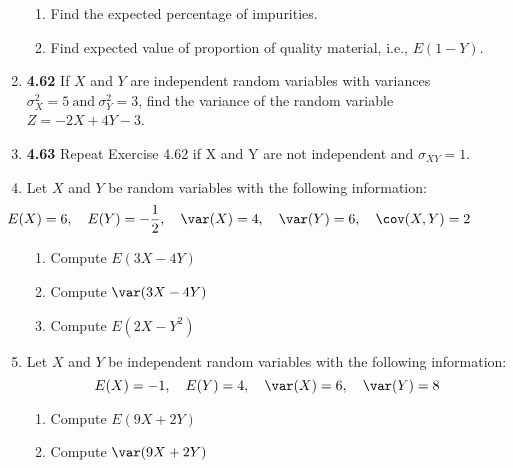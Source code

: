 \documentclass[basic, header]{nosvagor-notes}
\begin{document}
\begin{enumerate}[leftmargin=1.5em, itemsep=4em]
\begin{enumerate}[leftmargin=1.6em]
      \item Find the expected percentage of impurities.

      \item Find expected value of proportion of quality material, i.e.,
        \(E(1-Y)\).

    \end{enumerate}

  \newpage %

  \item \textbf{4.62} If \(X\) and \(Y\) are independent random variables with
    variances \(\sigma^2_X = 5 ~\text{and}~ \sigma^2_Y = 3\), find the variance
    of the random variable \(Z = -2X + 4Y - 3\).

  \item \textbf{4.63} Repeat Exercise 4.62 if X and Y are not independent and
    \(\sigma_{XY} = 1\).

  \item Let \(X\) and \(Y\) be random variables with the following information:
    \[%
     \hspace{-4em} E(X) = 6, \quad E(Y) = -\frac{1}{2}, \quad \var(X) = 4, \quad \var(Y) = 6, \quad \cov(X,Y) = 2
    \]%
    \begin{enumerate}[leftmargin=1.6em]

      \item Compute \(E(3X - 4Y)\)
      \item Compute \(\var(3X - 4Y)\)
      \item Compute \(E(2X - Y^2)\)

    \end{enumerate}

  \newpage %

  \item Let \(X\) and \(Y\) be independent random variables with the following
    information:
    \[%
     E(X) = -1, \quad E(Y) = 4, \quad \var(X) = 6, \quad \var(Y) = 8
    \]%
    \begin{enumerate}[leftmargin=1.6em]

      \item Compute \(E(9X + 2Y)\)
      \item Compute \(\var(9X + 2Y)\)


\end{enumerate}
\end{enumerate}
\end{document}

